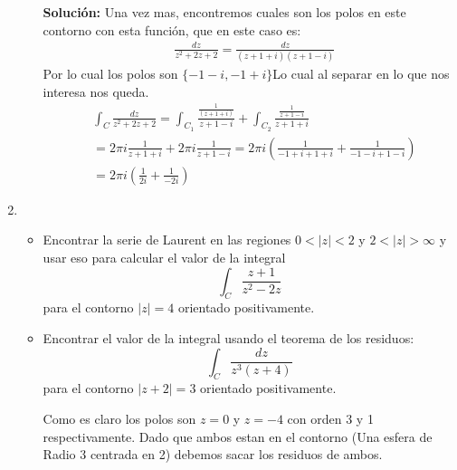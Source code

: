\documentclass[12pt]{exam}
\begin{document}
\begin{enumerate}
\begin{itemize}
    \textbf{Solución: }Una vez mas, encontremos cuales son los polos en este contorno con esta función, que en este caso es:
    \begin{align*}
        &\frac{dz}{z^2+2z+2}=\frac{dz}{(z+1+i)(z+1-i)}
    \end{align*}
    Por lo cual los polos son $\{-1-i,-1+i\}$Lo cual al separar en lo que nos interesa nos queda.
    \begin{align*}
        &\int_C \frac{dz}{z^2+2z+2} = \int_{C_1} \frac{\frac{1}{(z+1+i)}}{z+1-i} + \int_{C_2} \frac{\frac{1}{z+1-i}}{z+1+i}\\
        &=2 \pi i \frac{1}{z+1+i} + 2 \pi i \frac{1}{z+1-i}=2 \pi i \left(\frac{1}{-1+i+1+i} + \frac{1}{-1-i+1-i}\right)\\
        &=2 \pi i \left(\frac{1}{2i}+\frac{1}{-2i}\right)
    \end{align*}
\end{itemize}
\item \begin{itemize}
    \item Encontrar la serie de Laurent en las regiones $0<|z|<2$ y $2<|z|>\infty$ y usar eso para calcular el valor de
    la integral $$\displaystyle \int_C \frac{z+1}{z^2-2z}$$ para el contorno $|z|=4$ orientado positivamente.
    \item Encontrar el valor de la integral usando el teorema de los residuos: $$\displaystyle \int_C \frac{dz}{z^3(z+4)}$$
    para el contorno $|z+2|=3$ orientado positivamente.

    Como es claro los polos son $z=0$ y $z=-4$ con orden 3 y 1 respectivamente. Dado que ambos estan en el contorno (Una esfera
    de Radio 3 centrada en 2) debemos sacar los residuos de ambos.


\end{itemize}
\end{enumerate}
\end{document}

